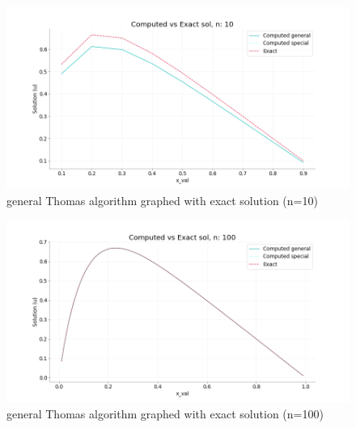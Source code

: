 \documentclass[%
oneside,                 %
final,                   %
10pt]{article}
\begin{document}
\begin{figure}[H]
\begin{center}
\graphicspath{ {ComputedvsExact/} }
\includegraphics[width=13cm]{ComputedvsExact_sol_n10.png}
\caption{general Thomas algorithm graphed with exact solution (n=10)}
\end{center}
\label{fig:ComvsEx_n10}
\end{figure}

\begin{figure}[H]
\begin{center}
\graphicspath{ {ComputedvsExact/} }
\includegraphics[width=13cm]{ComputedvsExact_sol_n100.png}
\caption{general Thomas algorithm graphed with exact solution (n=100)}
\end{center}
\end{figure}
\end{document}
